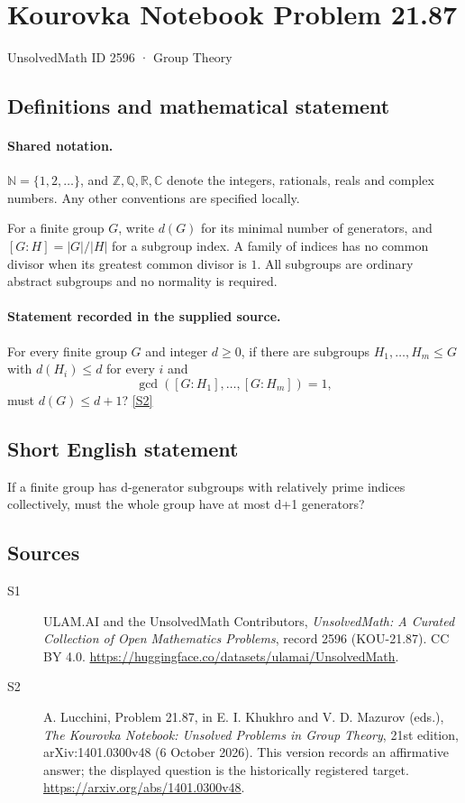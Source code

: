 \documentclass[11pt]{article}
\newcommand{\sref}[2]{\hyperlink{source:#1:#2}{[S#2]}}
\begin{document}
\setcounter{section}{2595}
\section{Kourovka Notebook Problem 21.87}\label{2596}
{\small\sffamily UnsolvedMath ID 2596 · Group Theory}
\subsection{Definitions and mathematical statement}

\paragraph{Shared notation.}$\mathbb N=\{1,2,\ldots\}$, and $\mathbb Z,\mathbb Q,\mathbb R,\mathbb C$ denote the integers, rationals, reals and complex numbers. Any other conventions are specified locally.


For a finite group $G$, write $d(G)$ for its minimal number of generators, and $[G:H]=|G|/|H|$ for a subgroup index. A family of indices has no common divisor when its greatest common divisor is $1$. All subgroups are ordinary abstract subgroups and no normality is required.
\paragraph{Statement recorded in the supplied source.}
For every finite group $G$ and integer $d\geq0$, if there are subgroups $H_1,\ldots,H_m\leq G$ with $d(H_i)\leq d$ for every $i$ and
\[
 \gcd([G:H_1],\ldots,[G:H_m])=1,
\]
must $d(G)\leq d+1$? \sref{2596}{2}
\subsection{Short English statement}
If a finite group has d-generator subgroups with relatively prime indices collectively, must the whole group have at most d+1 generators?
\subsection{Sources}
\begin{description}
\item[\hypertarget{source:2596:1}{S1}] ULAM.AI and the UnsolvedMath Contributors, \emph{UnsolvedMath: A Curated Collection of Open Mathematics Problems}, record 2596 (KOU-21.87). CC BY 4.0. \url{https://huggingface.co/datasets/ulamai/UnsolvedMath}.
\item[\hypertarget{source:2596:2}{S2}] A. Lucchini, Problem 21.87, in E. I. Khukhro and V. D. Mazurov (eds.), \emph{The Kourovka Notebook: Unsolved Problems in Group Theory}, 21st edition, arXiv:1401.0300v48 (6 October 2026). This version records an affirmative answer; the displayed question is the historically registered target. \url{https://arxiv.org/abs/1401.0300v48}.
\end{description}
\label{end:2596}
\end{document}
